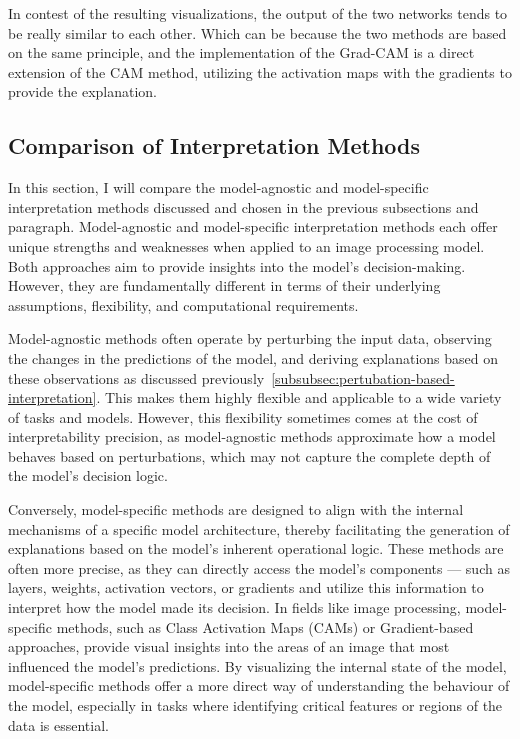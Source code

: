 In contest of the resulting visualizations, the output of the two networks tends to be really similar to each other.
Which can be because the two methods are based on the same principle, and the implementation of the Grad-CAM
is a direct extension of the CAM method, utilizing the activation maps with the gradients to provide the explanation.

\subsection{Comparison of Interpretation Methods}\label{subsec:evaluation-interpretation-methods}

In this section, I will compare the model-agnostic and model-specific interpretation methods discussed and chosen in the previous subsections
and paragraph.
Model-agnostic and model-specific interpretation methods each offer unique strengths and weaknesses when applied to
an image processing model.
Both approaches aim to provide insights into the model's decision-making.
However, they are fundamentally different in terms of their underlying assumptions, flexibility, and computational requirements.


Model-agnostic methods often operate by perturbing the input data, observing the changes in the  predictions of the model,
and deriving explanations based on these observations as discussed previously~\ref{subsubsec:pertubation-based-interpretation}.
This makes them highly flexible and applicable to a wide variety of tasks and models.
However, this flexibility sometimes comes at the cost of interpretability precision, as model-agnostic methods approximate
how a model behaves based on perturbations, which may not capture the complete depth of the model’s decision logic.

Conversely, model-specific methods are designed to align with the internal mechanisms of a specific model architecture,
thereby facilitating the generation of explanations based on the model's inherent operational logic.
These methods are often more precise, as they can directly access the model's components — such as layers,
weights, activation vectors, or gradients and utilize this information to interpret how the model made its decision.
In fields like image processing, model-specific methods, such as Class Activation Maps (CAMs) or Gradient-based approaches,
provide visual insights into the areas of an image that most influenced the model’s predictions.
By visualizing the internal state of the model, model-specific methods offer a more direct way of understanding the behaviour of the model,
especially in tasks where identifying critical features or regions of the data is essential.

